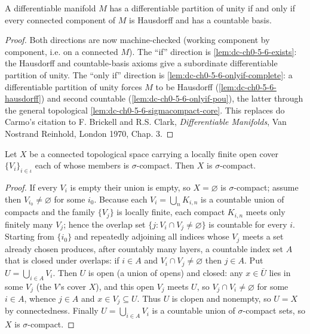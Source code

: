 \begin{theorem}
  \label{thm:dc-ch0-5-6}
  A differentiable manifold $M$ has a differentiable partition of unity if and only
  if every connected component of $M$ is Hausdorff and has a countable basis.
\end{theorem}
\begin{proof}
  \leanok
  Both directions are now machine-checked (working component by component, i.e. on a
  connected $M$). The ``if'' direction is \cref{lem:dc-ch0-5-6-exists}: the Hausdorff and
  countable-basis axioms give a subordinate differentiable partition of unity. The
  ``only if'' direction is \cref{lem:dc-ch0-5-6-onlyif-complete}: a differentiable
  partition of unity forces $M$ to be Hausdorff (\cref{lem:dc-ch0-5-6-hausdorff}) and
  second countable (\cref{lem:dc-ch0-5-6-onlyif-pou}), the latter through the general
  topological \cref{lem:dc-ch0-5-6-sigmacompact-core}. This replaces do Carmo's citation
  to F. Brickell and R.S. Clark, \emph{Differentiable Manifolds}, Van Nostrand Reinhold,
  London 1970, Chap. 3.
\end{proof}

\begin{lemma}
  \label{lem:dc-ch0-5-6-sigmacompact-core}
  \leanok
  Let $X$ be a connected topological space carrying a locally finite open cover
  $\{V_i\}_{i\in\iota}$ each of whose members is $\sigma$-compact. Then $X$ is
  $\sigma$-compact.
\end{lemma}
\begin{proof}
  \leanok
  If every $V_i$ is empty their union is empty, so $X=\varnothing$ is
  $\sigma$-compact; assume then $V_{i_0}\neq\varnothing$ for some $i_0$. Because each
  $V_i=\bigcup_n K_{i,n}$ is a countable union of compacts and the family
  $\{V_j\}$ is locally finite, each compact $K_{i,n}$ meets only finitely many
  $V_j$; hence the overlap set $\{j : V_i\cap V_j\neq\varnothing\}$ is countable for
  every $i$.
  Starting from $\{i_0\}$ and repeatedly adjoining all indices whose $V_j$ meets a
  set already chosen produces, after countably many layers, a countable index set
  $A$ that is closed under overlaps: if $i\in A$ and $V_i\cap V_j\neq\varnothing$
  then $j\in A$. Put $U=\bigcup_{i\in A}V_i$. Then $U$ is open (a union of opens) and
  closed: any $x\in\overline U$ lies in some $V_j$ (the $V$'s cover $X$), and this
  open $V_j$ meets $U$, so $V_j\cap V_i\neq\varnothing$ for some $i\in A$, whence
  $j\in A$ and $x\in V_j\subseteq U$. Thus $U$ is clopen and nonempty, so $U=X$ by
  connectedness. Finally $U=\bigcup_{i\in A}V_i$ is a countable union of
  $\sigma$-compact sets, so $X$ is $\sigma$-compact.
\end{proof}

